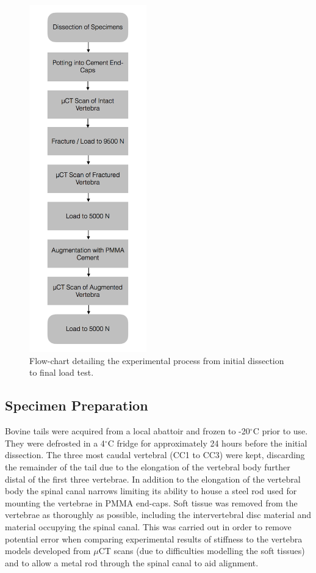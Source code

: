 \begin{figure}[ht!]
\centering
\includegraphics[width=2in]{images/Exp_FlowChart.png}
\caption{Flow-chart detailing the experimental process from initial dissection to final load test.}
\label{fig:exp_flowchart}
\end{figure}

\subsection{Specimen Preparation}\label{specimen-preparation-bov}

Bovine tails were acquired from a local abattoir and frozen to -20$^\circ$C prior to use.
They were defrosted
in a 4\(^\circ\)C fridge for approximately 24 hours before the
initial dissection. The three most caudal vertebral (CC1 to CC3) were kept,
discarding the remainder of the tail due to the elongation of the
vertebral body further distal of the first three vertebrae. In addition
to the elongation of the vertebral body the spinal canal narrows
limiting its ability to house a steel rod used for mounting the vertebrae in PMMA end-caps. Soft tissue was removed from the vertebrae as thoroughly as
possible, including the intervertebral disc material and material
occupying the spinal canal. This was carried out in order to remove
potential error when comparing experimental results of stiffness to the vertebra models developed from $\mu$CT scans (due to
difficulties modelling the soft tissues) and to allow a metal rod through
the spinal canal to aid alignment.


